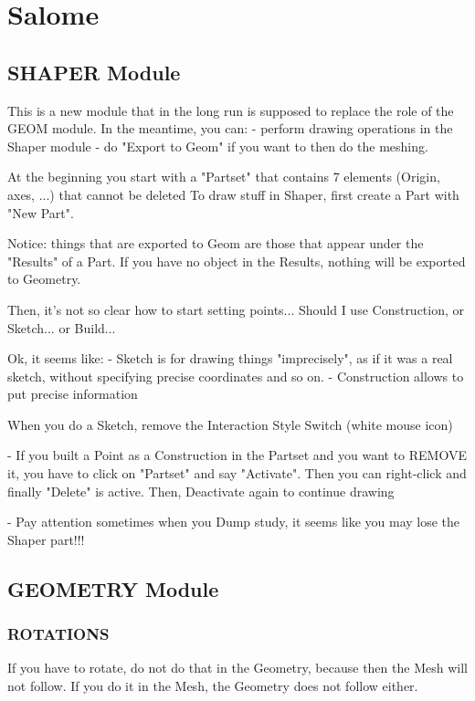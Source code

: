 \documentclass[10pt]{book}
\begin{document}
\part{Salome}


 \chapter{SHAPER Module}


This is a new module that in the long run is supposed to replace the role of the GEOM module.
In the meantime, you can:
  - perform drawing operations in the Shaper module 
  - do "Export to Geom" if you want to then do the meshing.

At the beginning you start with a "Partset" that contains 7 elements (Origin, axes, ...) that cannot be deleted  
To draw stuff in Shaper, first create a Part with "New Part".

Notice: things that are exported to Geom are those that appear under the "Results" of a Part.
If you have no object in the Results, nothing will be exported to Geometry.

Then, it's not so clear how to start setting points... Should I use Construction, or Sketch... or Build...

Ok, it seems like:
 - Sketch is for drawing things "imprecisely", as if it was a real sketch, without specifying precise coordinates and so on.
 - Construction allows to put precise information

 When you do a Sketch, remove the Interaction Style Switch (white mouse icon)
 
 - If you built a Point as a Construction in the Partset and you want to REMOVE it, you have to click on "Partset" and say "Activate". 
   Then you can right-click and finally "Delete" is active. Then, Deactivate again to continue drawing

 - Pay attention sometimes when you Dump study, it seems like you may lose the Shaper part!!!  
   
 \chapter{GEOMETRY Module}
 
 \section{ROTATIONS}


If you have to rotate, do not do that in the Geometry, because then the Mesh will not follow.
If you do it in the Mesh, the Geometry does not follow either.
\end{document}
